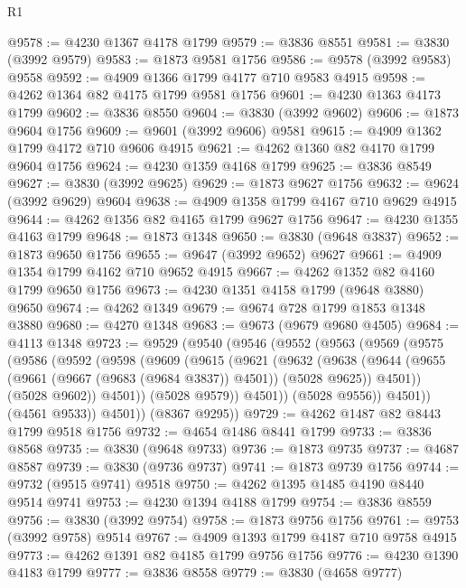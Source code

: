 \begin{lexlean}{R1}
\begin{coremodule}
@9578 := @4230 @1367 @4178 @1799
@9579 := @3836 @8551
@9581 := @3830 (@3992 @9579)
@9583 := @1873 @9581 @1756
@9586 := @9578 (@3992 @9583) @9558
@9592 := @4909 @1366 @1799 @4177 @710 @9583 @4915
@9598 := @4262 @1364 @82 @4175 @1799 @9581 @1756
@9601 := @4230 @1363 @4173 @1799
@9602 := @3836 @8550
@9604 := @3830 (@3992 @9602)
@9606 := @1873 @9604 @1756
@9609 := @9601 (@3992 @9606) @9581
@9615 := @4909 @1362 @1799 @4172 @710 @9606 @4915
@9621 := @4262 @1360 @82 @4170 @1799 @9604 @1756
@9624 := @4230 @1359 @4168 @1799
@9625 := @3836 @8549
@9627 := @3830 (@3992 @9625)
@9629 := @1873 @9627 @1756
@9632 := @9624 (@3992 @9629) @9604
@9638 := @4909 @1358 @1799 @4167 @710 @9629 @4915
@9644 := @4262 @1356 @82 @4165 @1799 @9627 @1756
@9647 := @4230 @1355 @4163 @1799
@9648 := @1873 @1348
@9650 := @3830 (@9648 @3837)
@9652 := @1873 @9650 @1756
@9655 := @9647 (@3992 @9652) @9627
@9661 := @4909 @1354 @1799 @4162 @710 @9652 @4915
@9667 := @4262 @1352 @82 @4160 @1799 @9650 @1756
@9673 := @4230 @1351 @4158 @1799 (@9648 @3880) @9650
@9674 := @4262 @1349
@9679 := @9674 @728 @1799 @1853 @1348 @3880
@9680 := @4270 @1348
@9683 := @9673 (@9679 @9680 @4505)
@9684 := @4113 @1348
@9723 := @9529
    (@9540
      (@9546
        (@9552
          (@9563
            (@9569
              (@9575
                (@9586
                  (@9592
                    (@9598
                      (@9609
                        (@9615
                          (@9621
                            (@9632
                              (@9638
                                (@9644
                                  (@9655 (@9661 (@9667 (@9683 (@9684 @3837)) @4501)) (@5028 @9625))
                                  @4501))
                              (@5028 @9602))
                            @4501))
                        (@5028 @9579))
                      @4501))
                  (@5028 @9556))
                @4501))
            (@4561 @9533))
          @4501))
      (@8367 @9295))
@9729 := @4262 @1487 @82 @8443 @1799 @9518 @1756
@9732 := @4654 @1486 @8441 @1799
@9733 := @3836 @8568
@9735 := @3830 (@9648 @9733)
@9736 := @1873 @9735
@9737 := @4687 @8587
@9739 := @3830 (@9736 @9737)
@9741 := @1873 @9739 @1756
@9744 := @9732 (@9515 @9741) @9518
@9750 := @4262 @1395 @1485 @4190 @8440 @9514 @9741
@9753 := @4230 @1394 @4188 @1799
@9754 := @3836 @8559
@9756 := @3830 (@3992 @9754)
@9758 := @1873 @9756 @1756
@9761 := @9753 (@3992 @9758) @9514
@9767 := @4909 @1393 @1799 @4187 @710 @9758 @4915
@9773 := @4262 @1391 @82 @4185 @1799 @9756 @1756
@9776 := @4230 @1390 @4183 @1799
@9777 := @3836 @8558
@9779 := @3830 (@4658 @9777)

\end{coremodule}
\end{lexlean}
